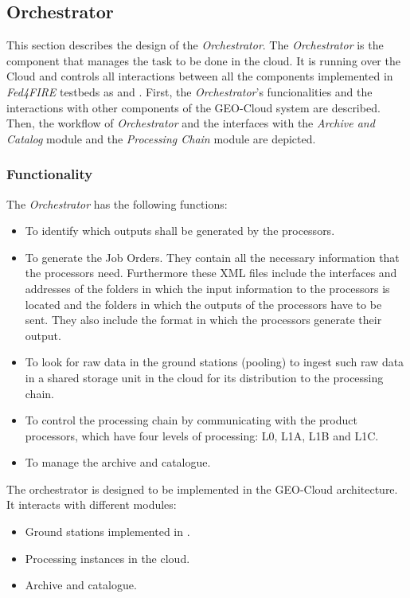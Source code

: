 \subsection{Orchestrator}

This section describes the design of the \emph{Orchestrator}. The \emph{Orchestrator} is the
component that manages the task to be done in the cloud. It is running over the
\bonfire Cloud and controls all interactions between all the components implemented in \emph{Fed4FIRE} testbeds as \bonfire and \vw.
First, the \emph{Orchestrator}'s funcionalities and the interactions with other
components of the GEO-Cloud system are described. Then, the workflow of
\emph{Orchestrator} and the interfaces with the \emph{Archive and Catalog} module and the
\emph{Processing Chain} module are depicted.


\subsubsection{Functionality}

The \emph{Orchestrator} has the following functions:

\begin{itemize}
\item To identify which outputs shall be generated by the processors.
\item To generate the Job Orders. They contain all the necessary information
  that the processors need. Furthermore these \ac{XML} files include the interfaces and addresses of the folders in which the input information to the processors is located and the folders in which the outputs of the processors have to be sent. They also include the format in which the processors generate their output.
\item To look for raw data in the ground stations (pooling) to ingest such raw data in a shared storage unit in the cloud for its distribution to the processing chain.
\item To control the processing chain by communicating with the product processors, which have four levels of processing: L0, L1A, L1B and L1C.
\item To manage the archive and catalogue.
\end{itemize}

The orchestrator is designed to be implemented in the GEO-Cloud architecture. It
interacts with different modules:
\begin{itemize}

\item Ground stations implemented in \vw.
\item Processing instances in the cloud.
\item Archive and catalogue.
\end{itemize}

